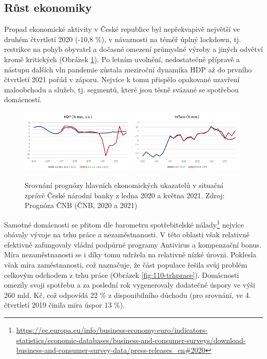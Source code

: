 \subsection*{Růst ekonomiky} 
Propad ekonomické aktivity v České republice byl nepřekvapivě největší ve druhém čtvrtletí 2020 (-10,8 \%), v návaznosti na téměř úplný lockdown, tj. restrikce na pohyb obyvatel a dočasné omezení průmyslné výroby a jiných odvětví kromě kritických (Obrázek \ref{fig:110-HDP}). Po letním uvolnění, nedostatečné přípravě a nástupu dalších vln pandemie zůstala meziroční dynamika HDP až do prvního čtvrtletí 2021 pořád v záporu. Nejvíce k tomu přispělo opakované uzavření maloobchodu a služeb, tj. segmentů, které jsou těsně svázané se spotřebou domácností. 

\begin{figure}[ht]
    \centering
    \includegraphics[width=0.49\textwidth]{./pic/HDP.png} \includegraphics[width=0.49\textwidth]{./pic/inflace.png}
    \caption{Srovnání prognózy hlavních ekonomických ukazatelů v situační zprávě České národní banky z ledna 2020 a května 2021. Zdroj: Prognóza ČNB (ČNB, 2020 a 2021)}
    \label{fig:110-HDP}
\end{figure} 

Samotné domácnosti se přitom dle barometru spotřebitelské nálady\footnote{\url{https://ec.europa.eu/info/business-economy-euro/indicators-statistics/economic-databases/business-and-consumer-surveys/download-business-and-consumer-survey-data/press-releases_en\#2020}} nejvíce obávaly vývoje na trhu práce a nezaměstnanosti. V této oblasti však relativně efektivně zafungovaly vládní podpůrné programy Antivirus a kompenzační bonus. Míra nezaměstnanosti se i díky tomu udržela na relativně nízké úrovni. Poklesla však míra za\-měst\-na\-nos\-ti, což naznačuje, že část populace řešila svůj problém celkovým odchodem z trhu práce (Obrázek \ref{fig:110-trhprace}). Domácnosti omezily svoji spotřebu a za poslední rok vygenerovaly dodatečné úspory ve výši 260 mld. Kč, což odpovídá 22 \% z disponibilního důchodu (pro srovnání, ve 4. čtvrtletí 2019 činila míra úspor 13 \%). 

